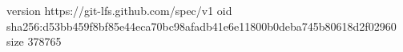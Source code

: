 version https://git-lfs.github.com/spec/v1
oid sha256:d53bb459f8bf85e44eca70bc98afadb41e6e11800b0deba745b80618d2f02960
size 378765
